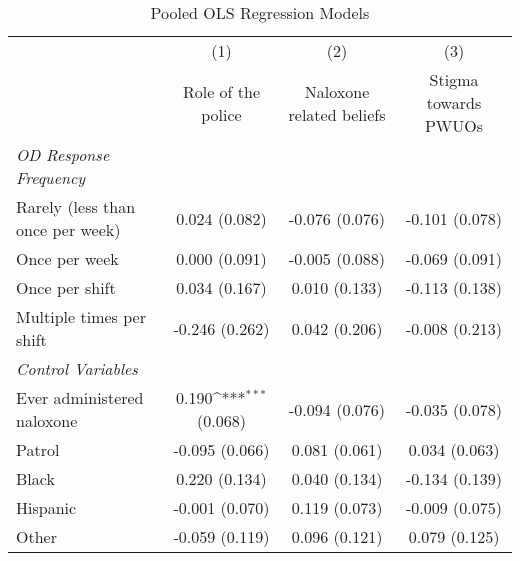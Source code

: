\begin{table}[htbp]\centering
\def\sym#1{\ifmmode^{#1}\else\(^{#1}\)\fi}
\caption{\centering Pooled OLS Regression Models}
\begin{tabular}{l*{3}{c}}
\toprule
                &\multicolumn{1}{c}{(1)}&\multicolumn{1}{c}{(2)}&\multicolumn{1}{c}{(3)}\\
                &\multicolumn{1}{c}{\hspace{0.25cm} Role of the police}&\multicolumn{1}{c}{\hspace{0.25cm} Naloxone related beliefs}&\multicolumn{1}{c}{\hspace{0.25cm} Stigma towards PWUOs}\\
\midrule
\emph{OD Response Frequency}&                  &                  &                  \\
\hspace{0.25cm} Rarely (less than once per week)&0.024 (0.082)         &-0.076 (0.076)         &-0.101 (0.078)         \\
\hspace{0.25cm} Once per week&0.000 (0.091)         &-0.005 (0.088)         &-0.069 (0.091)         \\
\hspace{0.25cm} Once per shift&0.034 (0.167)         &0.010 (0.133)         &-0.113 (0.138)         \\
\hspace{0.25cm} Multiple times per shift&-0.246 (0.262)         &0.042 (0.206)         &-0.008 (0.213)         \\
\vspace{0.1em} \emph{Control Variables}&                  &                  &                  \\
\hspace{0.25cm} Ever administered naloxone&0.190\sym{***} (0.068)         &-0.094 (0.076)         &-0.035 (0.078)         \\
\hspace{0.25cm} Patrol&-0.095 (0.066)         &0.081 (0.061)         &0.034 (0.063)         \\
\hspace{0.25cm} Black&0.220 (0.134)         &0.040 (0.134)         &-0.134 (0.139)         \\
\hspace{0.25cm} Hispanic&-0.001 (0.070)         &0.119 (0.073)         &-0.009 (0.075)         \\
\hspace{0.25cm} Other&-0.059 (0.119)         &0.096 (0.121)         &0.079 (0.125)         \\

\end{tabular}
\end{table}
